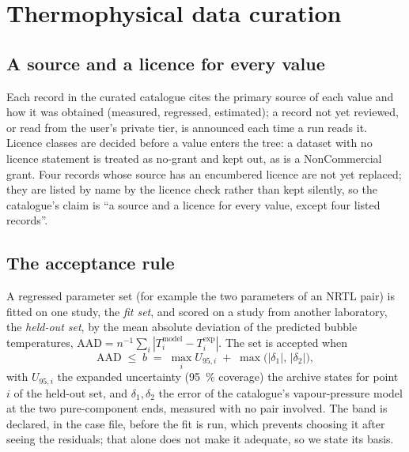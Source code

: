 \documentclass[preprint,12pt]{elsarticle}
\begin{document}
\section{Thermophysical data curation}
\label{sec:data}

\subsection{A source and a licence for every value}

Each record in the curated catalogue cites the primary source of each
value and how it was obtained (measured, regressed, estimated); a record
not yet reviewed, or read from the user's private tier, is announced each
time a run reads it.  Licence classes are decided before a value enters
the tree: a dataset with no licence statement is treated as no-grant and
kept out, as is a NonCommercial grant.  Four records whose source has an
encumbered licence are not yet replaced; they are listed by name by the
licence check rather than kept silently, so the catalogue's claim is
``a source and a licence for every value, except four listed records''.

\subsection{The acceptance rule}
\label{sec:accept}

A regressed parameter set (for example the two parameters of an NRTL
pair) is fitted on one study, the \emph{fit set}, and scored on a study
from another laboratory, the \emph{held-out set}, by the mean absolute
deviation of the predicted bubble temperatures,
$\mathrm{AAD} = n^{-1}\sum_i |T_i^\text{model} - T_i^\text{exp}|$.  The
set is accepted when
\begin{equation}
\mathrm{AAD} \;\le\; b \;=\; \max_i U_{95,i} \;+\; \max\big(|\delta_1|,\,|\delta_2|\big),
\label{eq:band}
\end{equation}
with $U_{95,i}$ the expanded uncertainty (95~\% coverage) the archive
states for point $i$ of the held-out set, and $\delta_1,\delta_2$ the
error of the catalogue's vapour-pressure model at the two pure-component
ends, measured with no pair involved.  The band is declared, in the case
file, before the fit is run, which prevents choosing it after seeing the
residuals; that alone does not make it adequate, so we state its basis.
\end{document}
